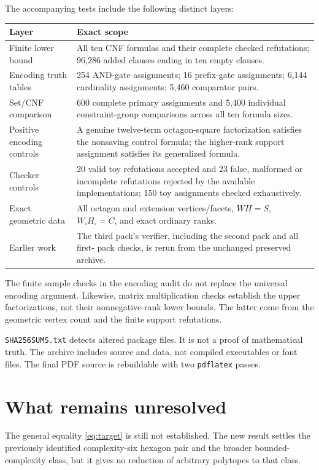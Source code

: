\documentclass[11pt,a4paper]{article}
\theoremstyle{definition}\newtheorem{definition}[theorem]{Definition}
\theoremstyle{remark}\newtheorem{remark}[theorem]{Remark}
\begin{document}
The accompanying tests include the following distinct layers:
\begin{center}\small
\begin{tabular}{@{}p{}p{}@{}}\toprule
Layer&Exact scope\\\midrule
Finite lower bound&All ten CNF formulas and their complete checked refutations;
96,286 added clauses ending in ten empty clauses.\\
Encoding truth tables&254 AND-gate assignments; 16 prefix-gate assignments;
6,144 cardinality assignments;
5,460 comparator pairs.\\
Set/CNF comparison&600 complete primary assignments and 5,400 individual
constraint-group comparisons across all ten formula sizes.\\
Positive encoding controls&A genuine twelve-term octagon-square factorization
satisfies the nonsaving control formula; the higher-rank support assignment
satisfies its generalized formula.\\
Checker controls&20 valid toy refutations accepted and 23 false, malformed or
incomplete refutations rejected by the available implementations; 150 toy
assignments checked exhaustively.\\
Exact geometric data&All octagon and extension vertices/facets, $WH=S$,
$W_{\square}H_{\square}=C$, and exact ordinary ranks.\\
Earlier work&The third pack's verifier, including the second pack and all first-
pack checks, is rerun from the unchanged preserved archive.\\\bottomrule
\end{tabular}
\end{center}
The finite sample checks in the encoding audit do not replace the universal
encoding argument. Likewise, matrix multiplication checks establish the upper
factorizations, not their nonnegative-rank lower bounds. The latter come from
the geometric vertex count and the finite support refutations.

\texttt{SHA256SUMS.txt} detects altered package files. It is not a proof of
mathematical truth. The archive includes source and data, not compiled
executables or font files. The final PDF source is rebuildable with two
\texttt{pdflatex} passes.

\section{What remains unresolved}\label{sec:remaining}
The general equality \eqref{eq:target} is still not established. The new result
settles the previously identified complexity-six hexagon pair and the broader
bounded-complexity class, but it gives no reduction of arbitrary polytopes to
that class.
\end{document}
